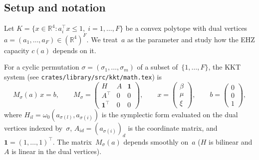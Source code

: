 %
%
%
%



\subsection*{Setup and notation}

Let $K = \{x \in \mathbb{R}^4 : a_i^\top x \leq 1,\; i = 1, \ldots, F\}$
be a convex polytope with dual vertices
$a = (a_1, \ldots, a_F) \in (\mathbb{R}^4)^F$.
We treat~$a$ as the parameter and study how the EHZ capacity
$c(a)$ depends on it.

For a cyclic permutation $\sigma = (\sigma_1, \ldots, \sigma_m)$
of a subset of~$\{1, \ldots, F\}$,
the KKT system (see \texttt{crates/library/src/kkt/math.tex}) is
\begin{equation}\label{eq:kkt-system}
  M_\sigma(a)\, x = b,
  \qquad
  M_\sigma = \begin{pmatrix}
    H & A & \mathbf{1} \\
    A^\top & 0 & 0 \\
    \mathbf{1}^\top & 0 & 0
  \end{pmatrix},
  \qquad
  x = \begin{pmatrix} \beta \\ \mu \\ \xi \end{pmatrix},
  \qquad
  b = \begin{pmatrix} 0 \\ 0 \\ 1 \end{pmatrix},
\end{equation}
where $H_{il} = \omega_0(a_{\sigma(l)}, a_{\sigma(i)})$ is the
symplectic form evaluated on the dual vertices indexed by~$\sigma$,
$A_{id} = (a_{\sigma(i)})_d$ is the coordinate matrix,
and $\mathbf{1} = (1, \ldots, 1)^\top$.
The matrix~$M_\sigma(a)$ depends smoothly on~$a$
($H$ is bilinear and $A$ is linear in the dual vertices).

